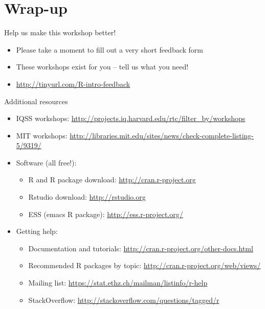 \documentclass[table,smaller]{beamer}
\begin{document}
\section{Wrap-up}
\label{sec-3}

\begin{frame}[label=sec-3-1]{Help us make this workshop better!}
\begin{itemize}
\item Please take a moment to fill out a very short feedback form

\item These workshops exist for you – tell us what you need!

\item \url{http://tinyurl.com/R-intro-feedback}
\end{itemize}
\end{frame}
\begin{frame}[label=sec-3-2]{Additional resources}
\begin{itemize}
\item IQSS workshops: \url{http://projects.iq.harvard.edu/rtc/filter_by/workshops}

\item MIT workshops: \url{http://libraries.mit.edu/sites/news/check-complete-listing-5/9319/}
\end{itemize}

\begin{itemize}
\item Software (all free!):
\begin{itemize}
\item R and R package download: \url{http://cran.r-project.org}
\item Rstudio download: \url{http://rstudio.org}
\item ESS (emacs R package): \url{http://ess.r-project.org/}
\end{itemize}

\item Getting help:
\begin{itemize}
\item Documentation and tutorials: \url{http://cran.r-project.org/other-docs.html}
\item Recommended R packages by topic: \url{http://cran.r-project.org/web/views/}
\item Mailing list: \url{https://stat.ethz.ch/mailman/listinfo/r-help}
\item StackOverflow: \url{http://stackoverflow.com/questions/tagged/r}
\end{itemize}
\end{itemize}
\end{frame}
\end{document}
